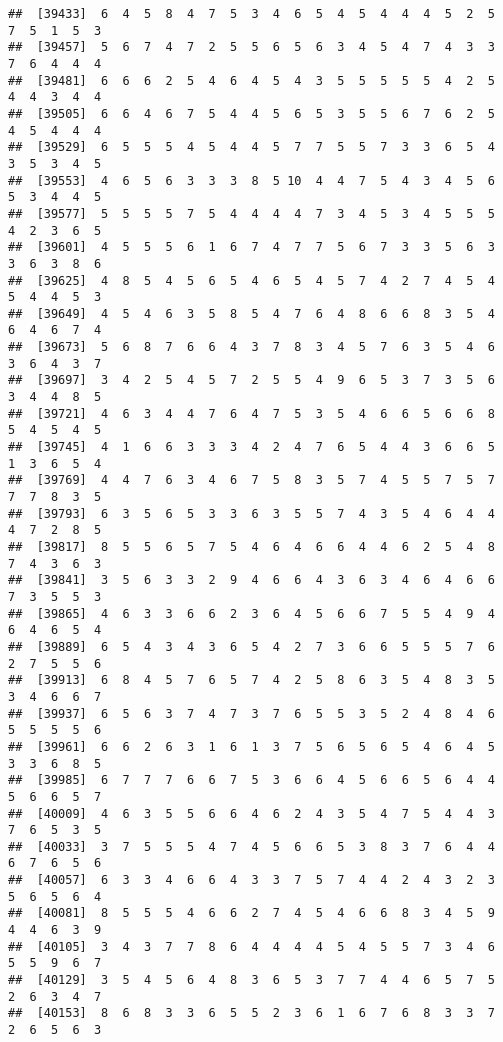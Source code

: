 \documentclass[
]{book}
\begin{document}
\begin{verbatim}
##  [39433]  6  4  5  8  4  7  5  3  4  6  5  4  5  4  4  4  5  2  5  7  5  1  5  3
##  [39457]  5  6  7  4  7  2  5  5  6  5  6  3  4  5  4  7  4  3  3  7  6  4  4  4
##  [39481]  6  6  6  2  5  4  6  4  5  4  3  5  5  5  5  5  4  2  5  4  4  3  4  4
##  [39505]  6  6  4  6  7  5  4  4  5  6  5  3  5  5  6  7  6  2  5  4  5  4  4  4
##  [39529]  6  5  5  5  4  5  4  4  5  7  7  5  5  7  3  3  6  5  4  3  5  3  4  5
##  [39553]  4  6  5  6  3  3  3  8  5 10  4  4  7  5  4  3  4  5  6  5  3  4  4  5
##  [39577]  5  5  5  5  7  5  4  4  4  4  7  3  4  5  3  4  5  5  5  4  2  3  6  5
##  [39601]  4  5  5  5  6  1  6  7  4  7  7  5  6  7  3  3  5  6  3  3  6  3  8  6
##  [39625]  4  8  5  4  5  6  5  4  6  5  4  5  7  4  2  7  4  5  4  5  4  4  5  3
##  [39649]  4  5  4  6  3  5  8  5  4  7  6  4  8  6  6  8  3  5  4  6  4  6  7  4
##  [39673]  5  6  8  7  6  6  4  3  7  8  3  4  5  7  6  3  5  4  6  3  6  4  3  7
##  [39697]  3  4  2  5  4  5  7  2  5  5  4  9  6  5  3  7  3  5  6  3  4  4  8  5
##  [39721]  4  6  3  4  4  7  6  4  7  5  3  5  4  6  6  5  6  6  8  5  4  5  4  5
##  [39745]  4  1  6  6  3  3  3  4  2  4  7  6  5  4  4  3  6  6  5  1  3  6  5  4
##  [39769]  4  4  7  6  3  4  6  7  5  8  3  5  7  4  5  5  7  5  7  7  7  8  3  5
##  [39793]  6  3  5  6  5  3  3  6  3  5  5  7  4  3  5  4  6  4  4  4  7  2  8  5
##  [39817]  8  5  5  6  5  7  5  4  6  4  6  6  4  4  6  2  5  4  8  7  4  3  6  3
##  [39841]  3  5  6  3  3  2  9  4  6  6  4  3  6  3  4  6  4  6  6  7  3  5  5  3
##  [39865]  4  6  3  3  6  6  2  3  6  4  5  6  6  7  5  5  4  9  4  6  4  6  5  4
##  [39889]  6  5  4  3  4  3  6  5  4  2  7  3  6  6  5  5  5  7  6  2  7  5  5  6
##  [39913]  6  8  4  5  7  6  5  7  4  2  5  8  6  3  5  4  8  3  5  3  4  6  6  7
##  [39937]  6  5  6  3  7  4  7  3  7  6  5  5  3  5  2  4  8  4  6  5  5  5  5  6
##  [39961]  6  6  2  6  3  1  6  1  3  7  5  6  5  6  5  4  6  4  5  3  3  6  8  5
##  [39985]  6  7  7  7  6  6  7  5  3  6  6  4  5  6  6  5  6  4  4  5  6  6  5  7
##  [40009]  4  6  3  5  5  6  6  4  6  2  4  3  5  4  7  5  4  4  3  7  6  5  3  5
##  [40033]  3  7  5  5  5  4  7  4  5  6  6  5  3  8  3  7  6  4  4  6  7  6  5  6
##  [40057]  6  3  3  4  6  6  4  3  3  7  5  7  4  4  2  4  3  2  3  5  6  5  6  4
##  [40081]  8  5  5  5  4  6  6  2  7  4  5  4  6  6  8  3  4  5  9  4  4  6  3  9
##  [40105]  3  4  3  7  7  8  6  4  4  4  4  5  4  5  5  7  3  4  6  5  5  9  6  7
##  [40129]  3  5  4  5  6  4  8  3  6  5  3  7  7  4  4  6  5  7  5  2  6  3  4  7
##  [40153]  8  6  8  3  3  6  5  5  2  3  6  1  6  7  6  8  3  3  7  2  6  5  6  3

\end{verbatim}
\end{document}
